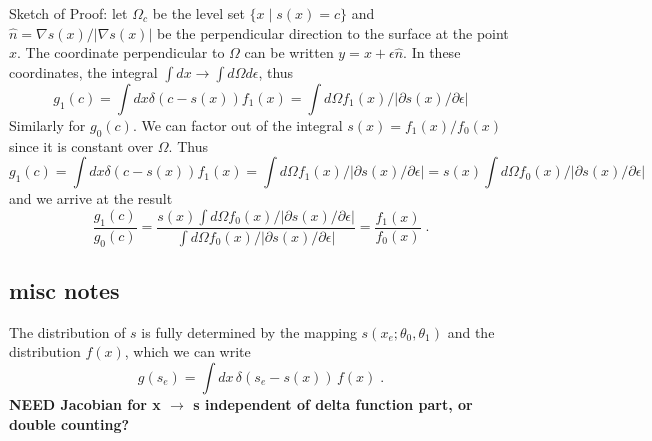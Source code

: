 \documentclass[11pt, oneside]{article}   	%
\begin{document}
Sketch of Proof: 
let $\Omega_{c}$ be the level set $\{x \mid s(x) = c \}$ and $\hat{n}=\nabla s(x) / |\nabla s(x)|$ be the perpendicular direction to the surface at the point $x$. The  coordinate perpendicular to $\Omega$ can be written $y = x+\epsilon \hat{n}$. In these coordinates, the integral $\int dx \to \int d\Omega d\epsilon$, thus
\begin{equation}
g_1(c) = \int dx \delta(c-s(x)) f_1(x) = \int d\Omega f_1(x) / |\partial s(x)/\partial \epsilon|
\end{equation}
Similarly for $g_0(c)$. We can factor out of the integral $s(x)=f_1(x)/f_0(x)$ since it is constant over $\Omega$.
Thus
\begin{equation}
g_1(c) = \int dx \delta(c-s(x)) f_1(x) = \int d\Omega f_1(x) / |\partial s(x)/\partial \epsilon| = s(x) \int d\Omega f_0(x) / |\partial s(x)/\partial \epsilon|
\end{equation}
and we arrive at the result
\begin{equation}
\frac{g_1(c)}{g_0(c)} = \frac{s(x) \int d\Omega f_0(x) / |\partial s(x)/\partial \epsilon|}{ \int d\Omega f_0(x) / |\partial s(x)/\partial \epsilon|} = \frac{f_1(x)}{f_0(x)} \;.
\end{equation}




\subsection{misc notes}




The distribution of $s$ is fully determined by the mapping $s(x_e; \theta_0, \theta_1)$ and the distribution $f(x)$, which we can write
\begin{equation}
g(s_e) = \int dx \, \delta(s_e-s(x)) \, f(x)  \; .
\end{equation}
\textbf{NEED Jacobian for x $\to$ s independent of delta function part, or double counting?}
\end{document}
